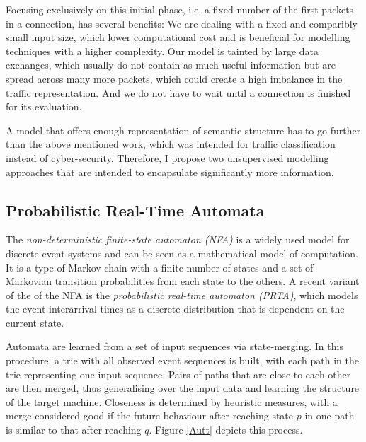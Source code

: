 \documentclass[a4paper,12pt,twoside]{report}
\begin{document}
Focusing exclusively on this initial phase, i.e. a fixed number of the first packets in a connection, has several benefits: We are dealing with a fixed and comparibly small input size, which lower computational cost and is beneficial for modelling techniques with a higher complexity. Our model is tainted by large data exchanges, which usually do not contain as much useful information but are spread across many more packets, which could create a high imbalance in the traffic representation. And we do not have to wait until a connection is finished for its evaluation.

A model that offers enough representation of semantic structure has to go further than the above mentioned work, which was intended for traffic classification instead of cyber-security. Therefore, I propose two unsupervised modelling approaches that are intended to encapsulate significantly more information.

\subsection{Probabilistic Real-Time Automata}\label{PRTA}

The \textit{non-deterministic finite-state automaton (NFA)} is a widely used model for discrete event systems and can be seen as a mathematical model of computation. It is a type of Markov chain with a finite number of states and a set of Markovian transition probabilities from each state to the others. A recent variant of the  of the NFA is the \textit{probabilistic real-time automaton (PRTA)}, which models the event interarrival times as a discrete distribution that is dependent on the current state. 

Automata are learned from a set of input sequences via state-merging. In this procedure, a trie with all observed event sequences is built, with each path in the trie representing one input sequence. Pairs of paths that are close to each other are then merged, thus generalising over the input data and learning the structure of the target machine. Closeness is determined by heuristic measures, with a merge  considered good if the future behaviour after  reaching state $p$ in one path is  similar to that after reaching $q$. Figure \ref{Autt} depicts this process.
\end{document}
